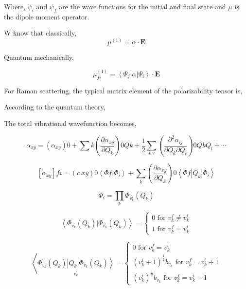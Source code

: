 \documentclass[openany,11pt,a4paper]{report}
\begin{document}
Where, $\psi_{i}$ and $\psi_{f}$ are the wave functions for the initial and final state and $\mu$ is the dipole moment operator. 

W know that classically,
\begin{equation}
\mu^{(1)}=\alpha \cdot \mathbf{E}
\end{equation}

Quantum mechanically,

$$
\mu_{f i}^{(1)}=\left\langle\Psi_{f}|\alpha| \Psi_{i}\right\rangle \cdot \mathbf{E}
$$

For Raman scattering, the typical matrix element of the polarizability tensor is, 



According to the quantum theory,

The total vibrational wavefunction becomes, 

\begin{equation}
\alpha_{x y}=\left(\alpha_{x y}\right){0}+\sum{k}\left(\frac{\partial \alpha_{x y}}{\partial Q_{k}}\right){0} Q{k}+\frac{1}{2} \sum_{k, l}\left(\frac{\partial^{2} \alpha_{i j}}{\partial Q_{k} \partial Q_{l}}\right){0} Q{k} Q_{l}+\cdots
\end{equation}

\begin{equation}
\left[\alpha_{x y}\right]{f i}=\left(\alpha{x y}\right){0}\left\langle\Phi{f} | \Phi_{i}\right\rangle+\sum_{k}\left(\frac{\partial \alpha_{x y}}{\partial Q_{k}}\right){0}\left\langle\Phi{f}\left|Q_{k}\right| \Phi_{i}\right\rangle
\end{equation}

\begin{equation}
\Phi_{i}=\prod_{k} \Phi_{v_{k}^{i}}\left(Q_{k}\right)
\end{equation}

\begin{equation}
\left\langle\Phi_{v_{k}^{\prime}}\left(Q_{k}\right) | \Phi_{v_{k}^{\prime}}\left(Q_{k}\right)\right\rangle=\left\{\begin{array}{l}{0 \text { for } v_{k}^{f} \neq v_{k}^{i}} \\ {1 \text { for } v_{k}^{f}=v_{k}^{i}}\end{array}\right.
\end{equation}


\begin{equation}
\left\langle\underset{v_{k}^{\prime}}{\left.\Phi_{v_{k}}^{\prime}\left(Q_{k}\right)\left|Q_{k}\right| \Phi_{v_{k}}\left(Q_{k}\right)\right\rangle}=\left\{\begin{array}{c}{0 \text { for } v_{k}^{f}=v_{k}^{i}} \\ {\left(v_{k}^{i}+1\right)^{\frac{1}{2}} b_{v_{k}} \text { for } v_{k}^{f}=v_{k}^{i}+1} \\ {\left(v_{k}^{i}\right)^{\frac{1}{2}} b_{v_{k}} \text { for } v_{k}^{f}=v_{k}^{i}-1}\end{array}\right.\right.
\end{equation}
\end{document}
